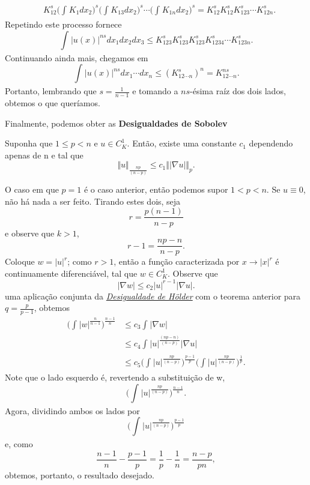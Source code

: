 \documentclass[measure_theory.tex]{subfiles}
\begin{document}
\begin{proof*}
\begin{align*}
		                                  & K_{12}^{s}\biggl(\int_{}^{}K_{1}dx_{2}\biggr)^{s}\biggl(\int_{}^{}K_{13}dx_{2}\biggr)^{s}\cdots \biggl(\int_{}^{}K_{1n}dx_{2}\biggr)^{s} = K_{12}^{s}K_{12}^{s}K_{123}^{s}\cdots K_{12n}^{s}.
	\end{align*}
	Repetindo este processo fornece
	\[
		\int_{}^{}|u(x)|^{ns}dx_{1}dx_{2}dx_{3}\leq K_{123}^{s}K_{123}^{s}K_{123}^{s}K_{1234}^{s}\cdots K_{123n}^{s}.
	\]
	Continuando ainda mais, chegamos em
	\[
		\int_{}^{}|u(x)|^{ns}dx_{1}\cdots dx_{n}\leq (K_{12\cdots n}^{s})^{n}=K_{12\cdots n}^{ns}.
	\]
	Portanto, lembrando que \(s=\frac{1}{n-1}\) e tomando a \(ns\)-ésima raíz dos dois lados, obtemos o que queríamos. \qedsymbol
\end{proof*}

Finalmente, podemos obter as \textbf{Desigualdades de Sobolev}
\hypertarget{sobolev_inequality}{
	\begin{theorem*}
		Suponha que \(1\leq p < n \) e \(u\in C_{K}^{1}.\) Então, existe uma constante \(c_{1}\) dependendo apenas de n e tal que
		\[
			\Vert u \Vert_{\frac{np}{(n-p)}}\leq c_{1}\Vert |\nabla u| \Vert_{p}.
		\]
	\end{theorem*}
}
\begin{proof*}
	O caso em que \(p=1\) é o caso anterior, então podemos supor \(1<p<n.\) Se \(u\equiv 0\), não há nada a ser feito. Tirando estes dois, seja
	\[
		r=\frac{p(n-1)}{n-p}
	\]
	e observe que \(k>1\),
	\[
		r-1=\frac{np-n}{n-p}.
	\]
	Coloque \(w=|u|^{r}\); como \(r>1\), então a função caracterizada por \(x\rightarrow |x|^{r}\) é continuamente diferenciável, tal que \(w\in C _{K}^{1}\). Observe que
	\[
		|\nabla w|\leq c_{2}|u|^{r-1}|\nabla u|.
	\]
	uma aplicação conjunta da \hyperlink{holder}{\textit{Desigualdade de Hölder}} com o teorema anterior para \(q=\frac{p}{p-1}\), obtemos
	\begin{align*}
		\biggl(\int_{}^{}|w|^{\frac{n}{n-1}}\biggr)^{\frac{n-1}{n}} & \leq c_{3}\int_{}^{}|\nabla w|                                                                                                         \\
		                                                            & \leq c_{4}\int_{}^{}|u|^{\frac{(np-n)}{(n-p)}}|\nabla u|                                                                               \\
		                                                            & \leq  c_{5}\biggl(\int_{}^{}|u|^{\frac{np}{(n-p)}}\biggr)^{\frac{p-1}{p}}\biggl(\int_{}^{}|u|^{\frac{np}{(n-p)}}\biggr)^{\frac{1}{p}}.
	\end{align*}
	Note que o lado esquerdo é, revertendo a substituição de w,
	\[
		\biggl(\int_{}^{}|u|^{\frac{np}{(n-p)}}\biggr)^{\frac{n-1}{n}}.
	\]
	Agora, dividindo ambos os lados por
	\[
		\biggl(\int_{}^{}|u|^{\frac{np}{(n-p)}}\biggr)^{\frac{p-1}{p}}
	\]
	e, como
	\[
		\frac{n-1}{n}-\frac{p-1}{p}=\frac{1}{p}-\frac{1}{n}=\frac{n-p}{pn},
	\]
	obtemos, portanto, o resultado desejado. \qedsymbol
\end{proof*}
\end{document}
